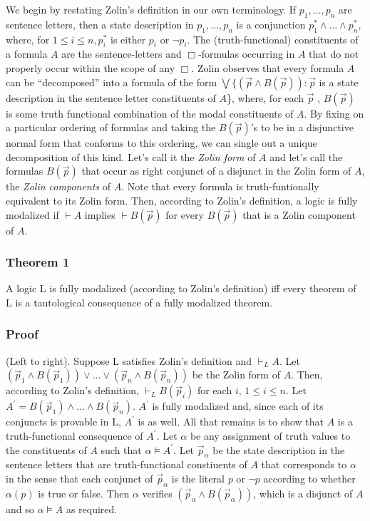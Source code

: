 \documentclass[
  11pt,
  letterpaper,
  DIV=11,
  numbers=noendperiod,
  twoside]{scrartcl}
\begin{document}
We begin by restating Zolin's definition in our own terminology. If
\(p_1,{\ldots},p_n\) are sentence letters, then a state description in
\({p_1,{\ldots},p_n}\) is a conjunction
\(p_1^*\wedge {\ldots}\wedge p_n^*\), where, for \(1\le i\le n, p_i^*\)
is either \(p_i\) or \(\neg p_i\). The (truth-functional) constituents
of a formula \(A\) are the sentence-letters and \(\Box\)-formulas
occurring in \(A\) that do not properly occur within the scope of any
\(\Box\). Zolin observes that every formula \(A\) can be ``decomposed''
into a formula of the form
\({\bigvee}\{(\vec{p}\wedge B(\vec{p}))\!:\vec{p}\) is a state
description in the sentence letter constituents of \(A\)\}, where, for
each \(\vec{p}\) , \(B(\vec{p})\) is some truth functional combination
of the modal constituents of \(A\). By fixing on a particular ordering
of formulas and taking the \(B(\vec{p})\)'s to be in a disjunctive
normal form that conforms to this ordering, we can single out a unique
decomposition of this kind. Let's call it the \emph{Zolin form} of \(A\)
and let's call the formulas \(B(\vec{p})\) that occur as right conjunct
of a disjunct in the Zolin form of \(A\), the \emph{Zolin components} of
\(A\). Note that every formula is truth-funtionally equivalent to its
Zolin form. Then, according to Zolin's definition, a logic is fully
modalized if \(\vdash A\) implies \(\vdash B(\vec{p})\) for every
\(B(\vec{p})\) that is a Zolin component of \(A\).

\subsubsection*{Theorem 1}\label{theorem-1}

A logic L is fully modalized (according to Zolin's definition) iff every
theorem of L is a tautological consequence of a fully modalized theorem.

\subsubsection*{Proof}\label{proof}

(Left to right). Suppose L satisfies Zolin's definition and
\(\vdash_L A\). Let
\((\vec{p}_1\wedge B(\vec{p}_1))\vee {\ldots}\vee (\vec{p}_n\wedge B(\vec{p}_n))\)
be the Zolin form of \(A\). Then, according to Zolin's definition,
\(\vdash_L B(\vec{p}_i)\) for each \(i\), \(1\le i\le n\). Let
\(A^\prime = B(\vec{p}_1)\wedge {\ldots}\wedge B(\vec{p}_n)\).
\(A^\prime\) is fully modalized and, since each of its conjuncts is
provable in L, \(A^\prime\) is as well. All that remains is to show that
\(A\) is a truth-functional consequence of \(A^\prime\). Let \(\alpha\)
be any assignment of truth values to the constituents of \(A\) such that
\(\alpha\models A^\prime\). Let \(\vec{p}_\alpha\) be the state
description in the sentence letters that are truth-functional
constiuents of \(A\) that corresponds to \(\alpha\) in the sense that
each conjunct of \(\vec{p}_\alpha\) is the literal \emph{p} or
\(\neg p\) according to whether \(\alpha(p)\) is true or false. Then
\(\alpha\) verifies \((\vec{p}_\alpha \wedge B(\vec{p}_\alpha))\), which
is a disjunct of \(A\) and so \(\alpha\models A\) as required.
\end{document}
